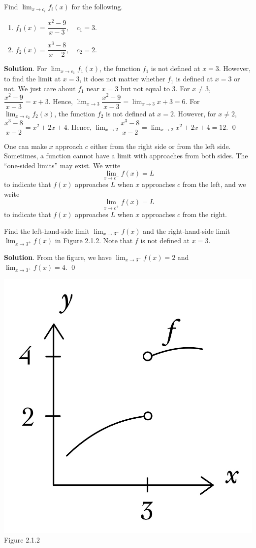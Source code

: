 \documentclass[11pt]{book}
\theoremstyle{break}
\theoremstyle{no_label}
\newcommand{\figtag}[1]{\\[-1.2em]Figure {#1}}
\numberwithin{equation}{section}
\begin{document}
\begin{example}
    Find $\displaystyle\lim_{x\to c_i}f_i(x)$ for the following.
    \begin{enumerate}
        \item $f_1(x)=\dfrac{x^2-9}{x-3}, \quad c_1=3$.
        \item $f_2(x)=\dfrac{x^3-8}{x-2}, \quad c_2=2$.
    \end{enumerate}
\end{example}
\textbf{Solution}. For $\displaystyle\lim_{x\to c_1}f_1(x)$, the function $f_1$ is not defined at $x=3$. However, to find the limit at $x=3$, it does not matter whether $f_1$ is defined at $x=3$ or not. We just care about $f_1$ near $x=3$ but not equal to $3$. For $x\ne 3$, $\dfrac{x^2-9}{x-3}=x+3$. Hence, $\displaystyle\lim_{x\to 3}\dfrac{x^2-9}{x-3}=\lim_{x\to 3}x+3=6$. For $\displaystyle\lim_{x\to c_2}f_2(x)$, the function $f_2$ is not defined at $x=2$. However, for $x\ne 2$, $\dfrac{x^3-8}{x-2}=x^2+2x+4$. Hence, $\displaystyle\lim_{x\to 2}\dfrac{x^3-8}{x-2}=\lim_{x\to 2}x^2+2x+4=12$. \qed

One can make $x$ approach $c$ either from the right side or from the left side. Sometimes, a function cannot have a limit with approaches from both sides. The ``one-sided limits'' may exist. We write $$\lim_{x\to c^-}f(x)=L$$ to indicate that $f(x)$ approaches $L$ when $x$ approaches $c$ from the left, and we write $$\lim_{x\to c^+}f(x)=L$$ to indicate that $f(x)$ approaches $L$ when $x$ approaches $c$ from the right.

\begin{example}
    Find the left-hand-side limit $\displaystyle\lim_{x\to 3^-}f(x)$ and the right-hand-side limit $\displaystyle\lim_{x\to 3^+}f(x)$ in Figure 2.1.2. Note that $f$ is not defined at $x=3$.
\end{example}
\textbf{Solution}. From the figure, we have $\displaystyle\lim_{x\to 3^-}f(x)=2$ and $\displaystyle\lim_{x\to 3^+}f(x)=4$. \qed

\begin{center}
    \includegraphics[width=0.7\textwidth/3]{two-side_limits.JPG}\figtag{2.1.2}
\end{center}
\end{document}
